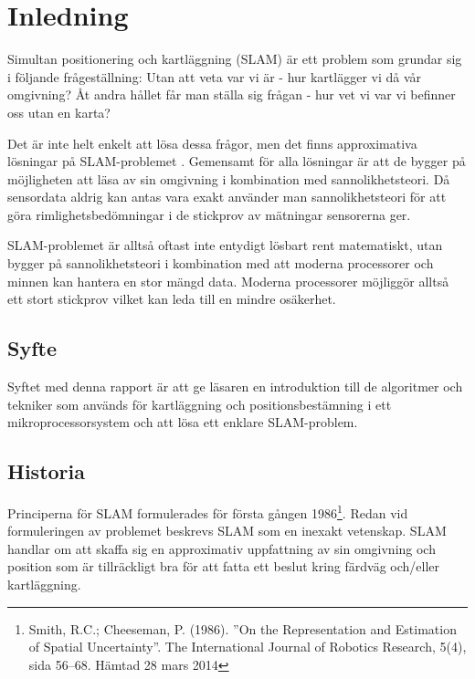 \documentclass[a4paper,12pt,fleqn]{article}
\begin{document}
\addto\captionsswedish{\renewcommand{\contentsname}{Innehållsförteckning}}

\tableofcontents
\thispagestyle{fancy}
\newpage


\section{Inledning}

Simultan positionering och kartläggning (SLAM) är ett problem som grundar sig i följande frågeställning: Utan att veta var vi är - hur kartlägger vi då vår omgivning? Åt andra hållet får man ställa sig frågan - hur vet vi var vi befinner oss utan en karta?

Det är inte helt enkelt att lösa dessa frågor, men det finns approximativa lösningar på SLAM-problemet . Gemensamt för alla lösningar är att de bygger på möjligheten att läsa av sin omgivning i kombination med
sannolikhetsteori. Då sensordata aldrig kan antas vara exakt använder man sannolikhetsteori för att göra rimlighetsbedömningar i de stickprov av mätningar sensorerna ger.

SLAM-problemet är alltså oftast inte entydigt lösbart rent matematiskt, utan
bygger på sannolikhetsteori i kombination med att moderna processorer
och minnen kan hantera en stor mängd data. Moderna processorer möjliggör
alltså ett stort stickprov vilket kan leda till en mindre osäkerhet.


\subsection{Syfte}
Syftet med denna rapport är att ge läsaren en introduktion till de algoritmer och tekniker som används för kartläggning och positionsbestämning i ett mikroprocessorsystem och att lösa ett enklare SLAM-problem. 

\subsection{Historia}

Principerna för SLAM formulerades för första gången 1986\footnote{Smith, R.C.; Cheeseman, P. (1986).
''On the Representation and Estimation of Spatial Uncertainty''. The
International Journal of Robotics Research, 5(4), sida 56–68. Hämtad 28 mars 2014}. Redan vid formuleringen av problemet beskrevs SLAM som en inexakt vetenskap. SLAM handlar om att skaffa sig en approximativ uppfattning av sin omgivning och position som är tillräckligt bra för att fatta ett beslut kring färdväg och/eller kartläggning. 
\end{document}
